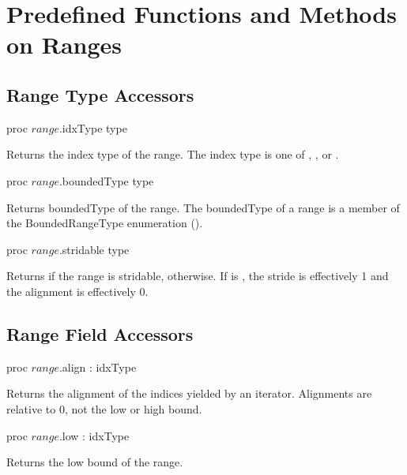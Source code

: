 \section{Predefined Functions and Methods on Ranges}

\subsection{Range Type Accessors}

\begin{protohead}
proc $range$.idxType type
\end{protohead}
\begin{protobody}
Returns the index type of the range.  The index type is one
of , ,  or .
\end{protobody}

\begin{protohead}
proc $range$.boundedType type
\end{protohead}
\begin{protobody}
Returns boundedType of the range.  The boundedType of a range is a member of the
BoundedRangeType enumeration ().
\end{protobody}

\begin{protohead}
proc $range$.stridable type
\end{protohead}
\begin{protobody}
Returns  if the range is stridable,  otherwise.  If  is
, the stride is effectively 1 and the alignment is effectively 0.
\end{protobody}

\subsection{Range Field Accessors}

\begin{protohead}
proc $range$.align : idxType
\end{protohead}
\begin{protobody}
Returns the alignment of the indices yielded by an iterator.  Alignments are
relative to 0, not the low or high bound.
\end{protobody}

\begin{protohead}
proc $range$.low : idxType
\end{protohead}
\begin{protobody}
Returns the low bound of the range.
\end{protobody}

